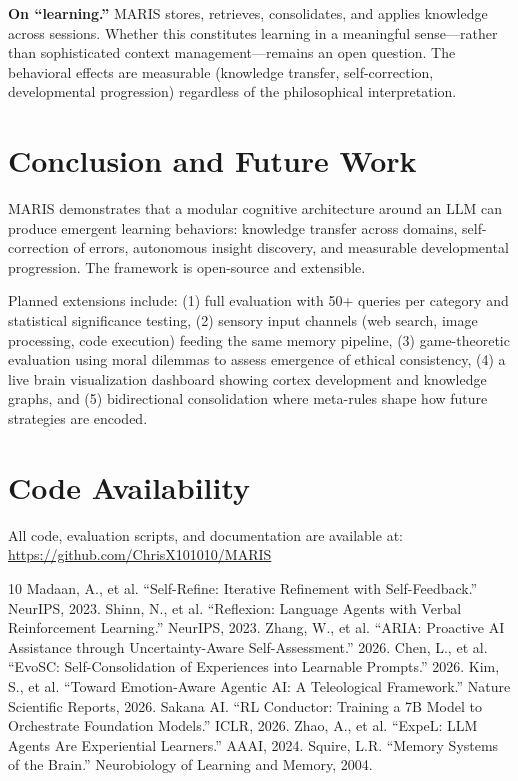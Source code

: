 \documentclass[11pt,a4paper]{article}
\begin{document}
\textbf{On ``learning.''} MARIS stores, retrieves, consolidates, and applies knowledge across sessions. Whether this constitutes learning in a meaningful sense---rather than sophisticated context management---remains an open question. The behavioral effects are measurable (knowledge transfer, self-correction, developmental progression) regardless of the philosophical interpretation.

\section{Conclusion and Future Work}

MARIS demonstrates that a modular cognitive architecture around an LLM can produce emergent learning behaviors: knowledge transfer across domains, self-correction of errors, autonomous insight discovery, and measurable developmental progression. The framework is open-source and extensible.

Planned extensions include: (1) full evaluation with 50+ queries per category and statistical significance testing, (2) sensory input channels (web search, image processing, code execution) feeding the same memory pipeline, (3) game-theoretic evaluation using moral dilemmas to assess emergence of ethical consistency, (4) a live brain visualization dashboard showing cortex development and knowledge graphs, and (5) bidirectional consolidation where meta-rules shape how future strategies are encoded.

\section*{Code Availability}

All code, evaluation scripts, and documentation are available at: \url{https://github.com/ChrisX101010/MARIS}

\begin{thebibliography}{10}
 Madaan, A., et al. ``Self-Refine: Iterative Refinement with Self-Feedback.'' NeurIPS, 2023.
 Shinn, N., et al. ``Reflexion: Language Agents with Verbal Reinforcement Learning.'' NeurIPS, 2023.
 Zhang, W., et al. ``ARIA: Proactive AI Assistance through Uncertainty-Aware Self-Assessment.'' 2026.
 Chen, L., et al. ``EvoSC: Self-Consolidation of Experiences into Learnable Prompts.'' 2026.
 Kim, S., et al. ``Toward Emotion-Aware Agentic AI: A Teleological Framework.'' Nature Scientific Reports, 2026.
 Sakana AI. ``RL Conductor: Training a 7B Model to Orchestrate Foundation Models.'' ICLR, 2026.
 Zhao, A., et al. ``ExpeL: LLM Agents Are Experiential Learners.'' AAAI, 2024.
 Squire, L.R. ``Memory Systems of the Brain.'' Neurobiology of Learning and Memory, 2004.
\end{thebibliography}
\end{document}
